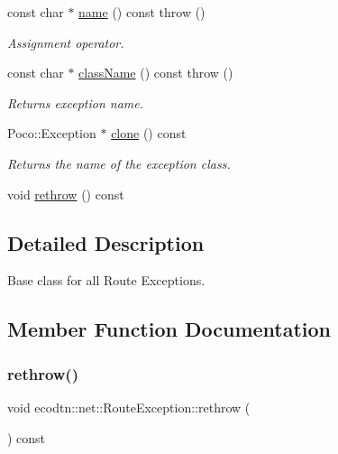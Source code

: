 \begin{DoxyCompactItemize}
const char $\ast$ \hyperlink{classecodtn_1_1net_1_1RouteException_aa15e125ab1895ae1fc8aee79ffc82175}{name} () const  throw ()
\begin{DoxyCompactList}\small\item\em Assignment operator. \end{DoxyCompactList}\item 
\mbox{\label{classecodtn_1_1net_1_1RouteException_a70ba439510724fd890b5189f54b689d8}} 
const char $\ast$ \hyperlink{classecodtn_1_1net_1_1RouteException_a70ba439510724fd890b5189f54b689d8}{class\+Name} () const  throw ()
\begin{DoxyCompactList}\small\item\em Returns exception name. \end{DoxyCompactList}\item 
\mbox{\label{classecodtn_1_1net_1_1RouteException_a7fa2b7e08cd208a717b63c24370ecf1c}} 
Poco\+::\+Exception $\ast$ \hyperlink{classecodtn_1_1net_1_1RouteException_a7fa2b7e08cd208a717b63c24370ecf1c}{clone} () const
\begin{DoxyCompactList}\small\item\em Returns the name of the exception class. \end{DoxyCompactList}\item 
void \hyperlink{classecodtn_1_1net_1_1RouteException_aea7a52fb632b2ad24b0d8cd04dfb08d3}{rethrow} () const
\end{DoxyCompactItemize}


\subsection{Detailed Description}
Base class for all Route Exceptions. 

\subsection{Member Function Documentation}
\mbox{\label{classecodtn_1_1net_1_1RouteException_aea7a52fb632b2ad24b0d8cd04dfb08d3}} 
\subsubsection{\texorpdfstring{rethrow()}{rethrow()}}
{\footnotesize\ttfamily void ecodtn\+::net\+::\+Route\+Exception\+::rethrow (\begin{DoxyParamCaption}{ }\end{DoxyParamCaption}) const\hspace{0.3cm}{\ttfamily [inline]}}

